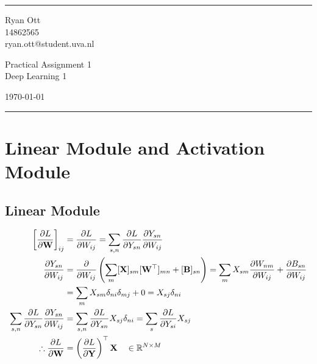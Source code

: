 \documentclass[a4paper]{article}
\begin{document}

\fancyhead[C]{}
\hrule \medskip %
\begin{minipage}{0.295\textwidth} 
\raggedright
\footnotesize
Ryan Ott \hfill\\   
14862565 \hfill\\
ryan.ott@student.uva.nl
\end{minipage}
\begin{minipage}{0.4\textwidth} 
\centering 
\large 
Practical Assignment 1\\ 
\normalsize 
Deep Learning 1\\ 
\end{minipage}
\begin{minipage}{0.295\textwidth} 
\raggedleft
\today\hfill\\
\end{minipage}
\medskip\hrule 
\bigskip

\section{Linear Module and Activation Module}
\subsection{Linear Module} %
\begin{align}
   \left[ \frac{\partial L}{\partial \mathbf{W}} \right]_{ij} &= \frac{\partial L}{\partial W_{ij}} = \sum_{s,n} \frac{\partial L}{\partial Y_{sn}} \frac{\partial Y_{sn}}{\partial W_{ij}} \\
   \frac{\partial Y_{sn}}{\partial W_{ij}} &= \frac{\partial}{\partial W_{ij}} \left( \sum_{m} [\mathbf{X}]_{sm} [\mathbf{W}^\top]_{mn} + [\mathbf{B}]_{sn} \right) = \sum_m X_{sm} \frac{\partial W_{nm}}{\partial W_{ij}} + \frac{\partial B_{sn}}{\partial W_{ij}} \\
   &= \sum_m X_{sm} \delta_{ni} \delta_{mj} + 0 = X_{sj} \delta_{ni} \\
   \sum_{s,n} \frac{\partial L}{\partial Y_{sn}} \frac{\partial Y_{sn}}{\partial W_{ij}} &= \sum_{s,n} \frac{\partial L}{\partial Y_{sn}} X_{sj} \delta_{ni} = \sum_{s} \frac{\partial L}{\partial Y_{si}} X_{sj} \\
   \therefore \frac{\partial L}{\partial \mathbf{W}} &= \left( \frac{\partial L}{\partial \mathbf{Y}} \right)^\top \mathbf{X} \quad \in \mathbb{R}^{N \times M}
\end{align}
\bigskip
\end{document}
